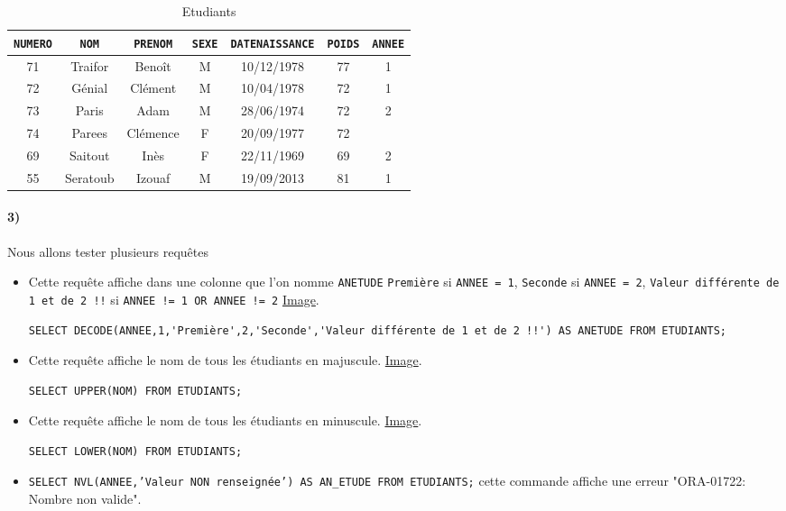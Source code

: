 \documentclass{report}
\begin{document}
\begin{table}[H]
	\center
	\begin{tabular}{|c|c|c|c|c|c|c|}
		\hline
		\verb+NUMERO+ & \verb+NOM+ & \verb+PRENOM+ & \verb+SEXE+ & \verb+DATENAISSANCE+ & \verb+POIDS+ & \verb+ANNEE+ \\
		\hline
		71 & Traifor & Benoît & M & 10/12/1978 & 77 & 1 \\
		\hline
		72 & Génial & Clément & M & 10/04/1978 & 72 & 1 \\
		\hline
		73 & Paris & Adam & M & 28/06/1974 & 72 & 2 \\
		\hline
		74 & Parees & Clémence & F & 20/09/1977 & 72 & \\
		\hline
		69 & Saitout & Inès & F & 22/11/1969 & 69 & 2 \\
		\hline
		55 & Seratoub & Izouaf & M & 19/09/2013 & 81 & 1 \\
		\hline
	\end{tabular}
	\caption{Etudiants}
\end{table}

\paragraph{3)}Nous allons tester plusieurs requêtes
\begin{itemize}
	\item Cette requête affiche dans une colonne que l'on nomme {\tt ANETUDE} {\tt Première} si {\tt ANNEE = 1}, {\tt Seconde} si {\tt ANNEE = 2}, {\tt Valeur différente de 1 et de 2 !!} si {\tt ANNEE != 1 OR ANNEE != 2} \href{run:./Images/TP3/tp3_1.png}{Image}.
	\begin{lstlisting}
SELECT DECODE(ANNEE,1,'Première',2,'Seconde','Valeur différente de 1 et de 2 !!') AS ANETUDE FROM ETUDIANTS;
	\end{lstlisting}
	\item Cette requête affiche le nom de tous les étudiants en majuscule. \href{run:./Images/TP3/tp3_2.png}{Image}.
	\begin{lstlisting}
SELECT UPPER(NOM) FROM ETUDIANTS;
	\end{lstlisting}
	\item Cette requête affiche le nom de tous les étudiants en minuscule. \href{run:./Images/TP3/tp3_3.png}{Image}.
	\begin{lstlisting}
SELECT LOWER(NOM) FROM ETUDIANTS;
	\end{lstlisting}
	\item {\tt SELECT NVL(ANNEE,'Valeur NON renseignée') AS AN\_ETUDE FROM ETUDIANTS;} cette commande affiche une erreur "ORA-01722: Nombre non valide".
\end{itemize}
\end{document}
